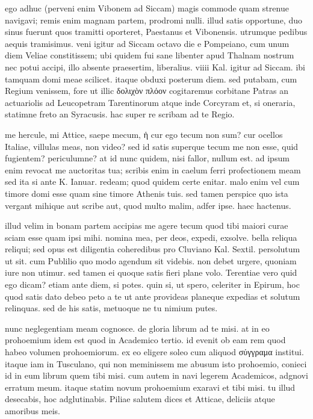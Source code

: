 


 ego adhuc (perveni enim Vibonem ad Siccam) magis commode quam strenue navigavi; remis enim magnam partem, prodromi nulli. illud satis opportune, duo sinus fuerunt quos tramitti oporteret, Paestanus et Vibonensis. utrumque pedibus aequis tramisimus. veni igitur ad Siccam octavo die e Pompeiano, cum unum diem Veliae constitissem; ubi quidem fui sane libenter apud Thalnam nostrum nec potui accipi, illo absente praesertim, liberalius. viiii Kal. igitur ad Siccam. ibi tamquam domi meae scilicet. itaque obduxi posterum diem. sed putabam, cum Regium venissem, fore ut illic δολιχὸν πλόον cogitaremus corbitane Patras an actuariolis ad Leucopetram Tarentinorum atque inde Corcyram et, si oneraria, statimne freto an Syracusis. hac super re scribam ad te Regio.

 me hercule, mi Attice, saepe mecum, ἡ cur ego tecum non sum? cur ocellos Italiae, villulas meas, non video? sed id satis superque tecum me non esse, quid fugientem? periculumne? at id nunc quidem, nisi fallor, nullum est. ad ipsum enim revocat me auctoritas tua; scribis enim in caelum ferri profectionem meam sed ita si ante K. Ianuar. redeam; quod quidem certe enitar. malo enim vel cum timore domi esse quam sine timore Athenis tuis. sed tamen perspice quo ista vergant mihique aut scribe aut, quod multo malim, adfer ipse. haec hactenus.

 illud velim in bonam partem accipias me agere tecum quod tibi maiori curae sciam esse quam ipsi mihi. nomina mea, per deos, expedi, exsolve. bella reliqua reliqui; sed opus est diligentia coheredibus pro Cluviano Kal. Sextil. persolutum ut sit. cum Publilio quo modo agendum sit videbis. non debet urgere, quoniam iure non utimur. sed tamen ei quoque satis fieri plane volo. Terentiae vero quid ego dicam? etiam ante diem, si potes. quin si, ut spero, celeriter in Epirum, hoc quod satis dato debeo peto a te ut ante provideas planeque expedias et solutum relinquas. sed de his satis, metuoque ne tu nimium putes.

 nunc neglegentiam meam cognosce. de gloria librum ad te misi. at in eo prohoemium idem est quod in Academico tertio. id evenit ob eam rem quod habeo volumen prohoemiorum. ex eo eligere soleo cum aliquod σύγγραμα institui. itaque iam in Tusculano, qui non meminissem me abusum isto prohoemio, conieci id in eum librum quem tibi misi. cum autem in navi legerem Academicos, adgnovi erratum meum. itaque statim novum prohoemium exaravi et tibi misi. tu illud desecabis, hoc adglutinabis. Piliae salutem dices et Atticae, deliciis atque amoribus meis.
